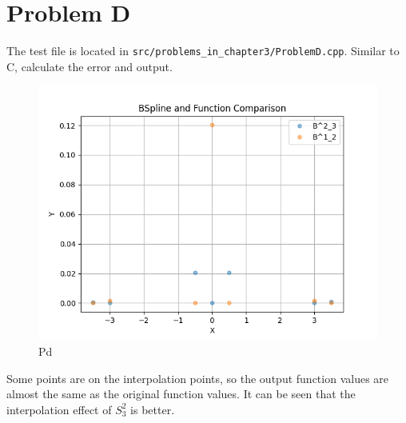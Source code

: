 \documentclass[a4paper]{article}
\begin{document}
    \section*{Problem D}
    The test file is located in \texttt{src/problems\_in\_chapter3/ProblemD.cpp}.
    Similar to C, calculate the error and output.
    \begin{figure}[H] 
        \centering
        \includegraphics{../figure/Pd.png} 
        \caption{Pd} 
    \end{figure}
    Some points are on the interpolation points, so the output function values are almost the same as the original function values.
    It can be seen that the interpolation effect of $S^2_3$ is better.
    
\end{document}
